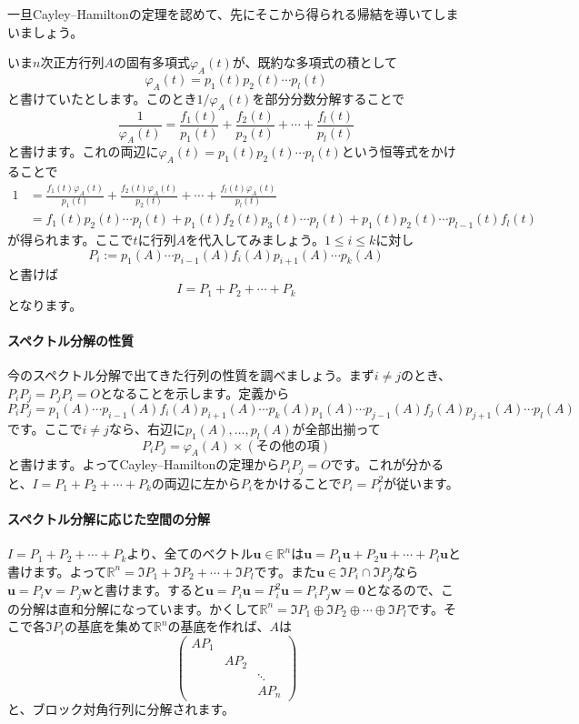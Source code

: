 一旦Cayley--Hamiltonの定理を認めて、先にそこから得られる帰結を導いてしまいましょう。

いま$n$次正方行列$A$の固有多項式$\varphi_A(t)$が、既約な多項式の積として
\[
\varphi_A(t) = p_1(t) p_2(t) \cdots p_l(t)
\]
と書けていたとします。このとき$1/\varphi_A(t)$を部分分数分解することで
\[
\frac{1}{\varphi_A(t)} = \frac{f_1(t)}{p_1(t)} + \frac{f_2(t)}{p_2(t)} + \cdots + \frac{f_l(t)}{p_l(t)}
\]
と書けます。これの両辺に$\varphi_A(t) = p_1(t) p_2(t) \cdots p_l(t)$という恒等式をかけることで
\begin{align*}
1 &= \frac{f_1(t)\varphi_A(t)}{p_1(t)} + \frac{f_2(t)\varphi_A(t)}{p_2(t)} + \cdots + \frac{f_l(t)\varphi_A(t)}{p_l(t)} \\
&= f_1(t) p_2(t) \cdots p_l(t) + p_1(t) f_2(t) p_3(t) \cdots p_l(t) + p_1(t) p_2(t) \cdots p_{l - 1}(t) f_l(t)
\end{align*}
が得られます。ここで$t$に行列$A$を代入してみましょう。$1 \leq i \leq k$に対し
\[
P_i := p_1(A) \cdots p_{i - 1}(A) f_i(A) p_{i + 1}(A) \cdots p_k(A)
\]
と書けば
\[
I = P_1 + P_2 + \cdots + P_k
\]
となります。

\paragraph{スペクトル分解の性質}

今のスペクトル分解で出てきた行列の性質を調べましょう。まず$i \neq j$のとき、$P_iP_j = P_jP_i = O$となることを示します。定義から
\[
P_i P_j = p_1(A) \cdots p_{i - 1}(A) f_i(A) p_{i + 1}(A) \cdots p_k(A) p_1(A) \cdots p_{j - 1}(A) f_j(A) p_{j + 1}(A) \cdots p_l(A)
\]
です。ここで$i \neq j$なら、右辺に$p_1(A), \ldots, p_l(A)$が全部出揃って
\[
P_i P_j = \varphi_A(A) \times (\text{その他の項})
\]
と書けます。よってCayley--Hamiltonの定理から$P_i P_j = O$です。これが分かると、$I = P_1 + P_2 + \cdots + P_k$の両辺に左から$P_i$をかけることで$P_i = P_i^2$が従います。

\paragraph{スペクトル分解に応じた空間の分解}

$I = P_1 + P_2 + \cdots + P_k$より、全てのベクトル$\bm{u} \in \mathbb{R}^n$は$\bm{u} = P_1\bm{u} + P_2\bm{u} + \cdots + P_l\bm{u}$と書けます。よって$\mathbb{R}^n = \Im P_1 + \Im P_2 + \cdots + \Im P_l$です。また$\bm{u} \in \Im P_i \cap \Im P_j$なら$\bm{u} = P_i \bm{v} = P_j \bm{w}$と書けます。すると$\bm{u} = P_i \bm{u} = P_i^2 \bm{u} = P_i P_j \bm{w} = \bm{0}$となるので、この分解は直和分解になっています。かくして$\mathbb{R}^n = \Im P_1 \oplus \Im P_2 \oplus \cdots \oplus \Im P_l$です。そこで各$\Im P_i$の基底を集めて$\mathbb{R}^n$の基底を作れば、$A$は
\[
\begin{pmatrix}
AP_1 \\
& AP_2 \\
& & \ddots \\
& & AP_n
\end{pmatrix}
\]
と、ブロック対角行列に分解されます。

